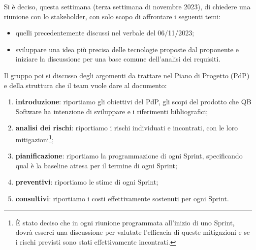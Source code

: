\documentclass[12pt]{article}
\begin{document}
		\noindent
		Si è deciso, questa settimana (terza settimana di novembre 2023), di chiedere una riunione con lo stakeholder, con solo scopo di affrontare i seguenti temi:
		\begin{itemize}
			\item quelli precedentemente discussi nel verbale del 06/11/2023;
			\item sviluppare una idea più precisa delle tecnologie proposte dal proponente e iniziare la discussione per una base comune dell'analisi dei requisiti.
		\end{itemize}
		\noindent
		Il gruppo poi si discusso degli argomenti da trattare nel Piano di Progetto (PdP) e della struttura che il team vuole dare al documento:
		\begin{enumerate}
			\item \textbf{introduzione}: riportiamo gli obiettivi del PdP, gli scopi del prodotto che QB Software ha intenzione di sviluppare e i riferimenti bibliografici;
			\item \textbf{analisi dei rischi}: riportiamo i rischi individuati e incontrati, con le loro mitigazioni\footnote{È stato deciso che in ogni riunione programmata all'inizio di uno Sprint, dovrà esserci una discussione per valutate l'efficacia di queste mitigazioni e se i rischi previsti sono stati effettivamente incontrati.};
			\item \textbf{pianificazione}: riportiamo la programmazione di ogni Sprint, specificando qual è la baseline attesa per il termine di ogni Sprint;
			\item \textbf{preventivi}: riportiamo le stime di ogni Sprint;
			\item \textbf{consultivi}: riportiamo i costi effettivamente sostenuti per ogni Sprint.
		\end{enumerate}
		
\end{document}
